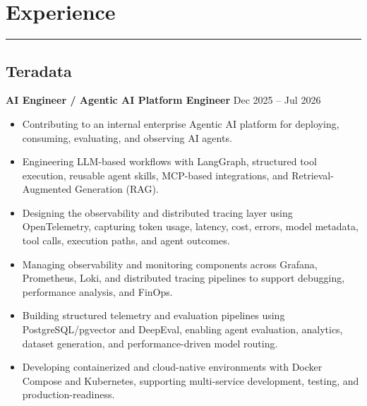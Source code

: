 \documentclass[11pt]{article}
\begin{document}
\section{Experience}
\vspace{-10pt}
\noindent\rule{\textwidth}{0.4pt}

\subsection{Teradata}
\textbf{AI Engineer / Agentic AI Platform Engineer} \hfill Dec 2025 -- Jul 2026
\begin{itemize}
\item Contributing to an internal enterprise Agentic AI platform for deploying, consuming, evaluating, and observing AI agents.
\item Engineering LLM-based workflows with LangGraph, structured tool execution, reusable agent skills, MCP-based integrations, and Retrieval-Augmented Generation (RAG).
\item Designing the observability and distributed tracing layer using OpenTelemetry, capturing token usage, latency, cost, errors, model metadata, tool calls, execution paths, and agent outcomes.
\item Managing observability and monitoring components across Grafana, Prometheus, Loki, and distributed tracing pipelines to support debugging, performance analysis, and FinOps.
\item Building structured telemetry and evaluation pipelines using PostgreSQL/pgvector and DeepEval, enabling agent evaluation, analytics, dataset generation, and performance-driven model routing.
\item Developing containerized and cloud-native environments with Docker Compose and Kubernetes, supporting multi-service development, testing, and production-readiness.
\end{itemize}
\end{document}
